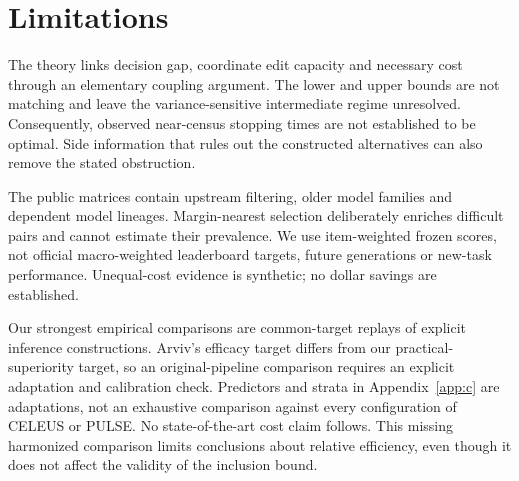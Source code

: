 \section{Limitations}\label{sec:7}\label{limitations}

The theory links decision gap, coordinate edit capacity and necessary cost through an elementary coupling argument. The lower and upper bounds are not matching and leave the variance-sensitive intermediate regime unresolved. Consequently, observed near-census stopping times are not established to be optimal. Side information that rules out the constructed alternatives can also remove the stated obstruction.

The public matrices contain upstream filtering, older model families and dependent model lineages. Margin-nearest selection deliberately enriches difficult pairs and cannot estimate their prevalence. We use item-weighted frozen scores, not official macro-weighted leaderboard targets, future generations or new-task performance. Unequal-cost evidence is synthetic; no dollar savings are established.

Our strongest empirical comparisons are common-target replays of explicit inference constructions. Arviv's efficacy target differs from our practical-superiority target, so an original-pipeline comparison requires an explicit adaptation and calibration check. Predictors and strata in Appendix~\ref{app:c} are adaptations, not an exhaustive comparison against every configuration of CELEUS or PULSE. No state-of-the-art cost claim follows. This missing harmonized comparison limits conclusions about relative efficiency, even though it does not affect the validity of the inclusion bound.
